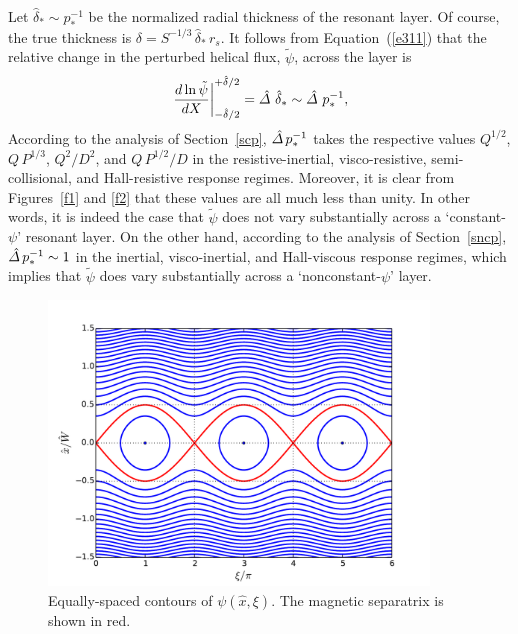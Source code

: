 \documentclass[notitlepage,12pt]{article}
\begin{document}
Let $\hat{\delta}_\ast\sim p_\ast^{-1}$ be the normalized radial thickness of the resonant layer.  Of course, the true thickness is
$\delta = S^{-1/3}\,\hat{\delta}_\ast\,r_s$.  It follows from
Equation~(\ref{e311}) that the relative change in the perturbed helical flux, $\tilde{\psi}$, across the layer
is
\begin{equation}
\left.\frac{d\ln\tilde{\psi}}{dX}\right|_{-\hat{\delta}/2}^{+\hat{\delta}/2} = \hat{\mit\Delta}\,\,\hat{\delta}_\ast\sim \hat{\mit\Delta}\,\,p_\ast^{-1},
\end{equation}
According to the  analysis of Section~\ref{scp}, $\hat{\mit\Delta}\,p_\ast^{-1}$ takes the respective values $Q^{1/2}$, $Q\,P^{1/3}$, 
$Q^2/D^2$, and $Q\,P^{1/2}/D$ in the resistive-inertial, visco-resistive, semi-collisional, and
Hall-resistive response regimes. Moreover, it is clear from Figures~\ref{f1} and \ref{f2} that these values are all
much less than unity. In other words, it is indeed the case that $\tilde{\psi}$ does not vary substantially across a
`constant-$\psi$' resonant layer. On the other hand, according to the analysis of Section~\ref{sncp}, $\hat{\mit\Delta}\,p_\ast^{-1}\sim 1$ in the inertial,
visco-inertial, and Hall-viscous response regimes, which implies that $\tilde{\psi}$ does vary substantially
across a `nonconstant-$\psi$' layer. 

\begin{figure}[t]
\centerline{\includegraphics[width=0.9\textwidth]{Island.pdf}}
\caption{Equally-spaced contours of $\psi(\hat{x},\xi)$. The magnetic separatrix is shown in red. }\label{f2a}
\end{figure}
\end{document}
